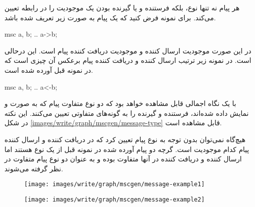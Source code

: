 هر پیام نه تنها نوع، بلکه فرستنده و یا گیرنده بودن یک موجودیت را
در رابطه تعیین می‌کند. برای نمونه فرض کنید که یک پیام به صورت زیر تعریف شده
باشد.

\begin{MSC}
msc {
	a, b;
	..
	a->b;
}
\end{MSC}

در این صورت موجودیت  ارسال کننده و موجودیت  دریافت کننده پیام است.
این درحالی است. در نمونه زیر ترتیب ارسال کننده و دریافت کننده پیام برعکس آن چیزی
است که در نمونه قبل آورده شده است.

\begin{MSC}
msc {
	a, b;
	..
	a<-b;
}
\end{MSC}

با یک نگاه اجمالی قابل مشاهده خواهد بود که دو نوع متفاوت پیام که به صورت \lr{->}
و \lr{<-} نمایش داده شده‌اند، فرستنده و گیرنده را به گونه‌های متفاوتی تعیین
می‌کنند. این نکته در شکل \ref{images/write/graph/mscgen/message-type}
قابل مشاهده است. 

\begin{note}
هیچ‌گاه نمی‌توان بدون توجه به نوع پیام تعیین کرد که در  دریافت کننده و ارسال کننده پیام کدام موجودیت است. گرچه دو پیام آورده شده
در نمونه  قبل از یک نوع هستند اما ارسال کننده و دریافت کننده در آنها متفاوت بوده
و به عنوان دو نوع پیام متفاوت در نظر گرفته می‌شوند.
\end{note}

\begin{figure}
                \centering
                \texttt{[image: images/write/graph/mscgen/message-example1]}
                \label{images/write/graph/mscgen/message-example1}
\end{figure}
%         
\begin{figure}
                \centering
                \texttt{[image: images/write/graph/mscgen/message-example2]}
                \label{images/write/graph/mscgen/message-example2}
\end{figure}

